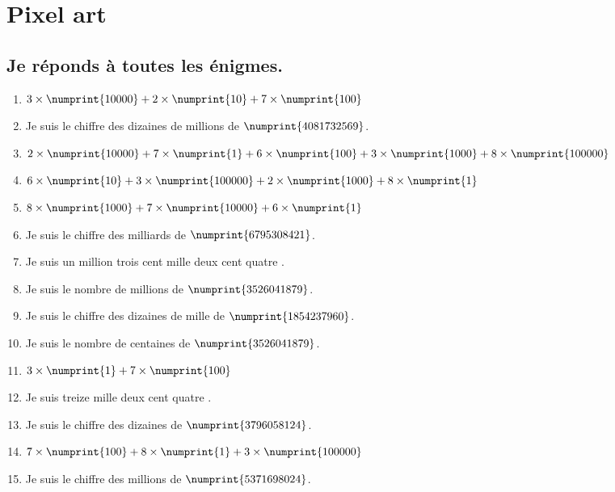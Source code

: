 \documentclass[10pt,a4paper]{article}
\newcommand{\solution}[1]{}
\begin{document}
\section*{Pixel art}
\subsection{Je réponds à toutes les énigmes.}
\begin{multicols}{2}
\begin{enumerate}
\item $3\times\numprint{10000} + 2\times\numprint{10} + 7\times\numprint{100}$
\solution{\numprint{30720}}
\item Je suis le chiffre des dizaines de millions de $\numprint{4081732569}$.
\solution{\numprint{8}}
\item $2\times\numprint{10000} + 7\times\numprint{1} + 6\times\numprint{100} + 3\times\numprint{1000} + 8\times\numprint{100000}$
\solution{\numprint{823607}}
\item $6\times\numprint{10} + 3\times\numprint{100000} + 2\times\numprint{1000} + 8\times\numprint{1}$
\solution{\numprint{302068}}
\item $8\times\numprint{1000} + 7\times\numprint{10000} + 6\times\numprint{1}$
\solution{\numprint{78006}}
\item Je suis le chiffre des milliards de $\numprint{6795308421}$.
\solution{\numprint{6}}
\item Je suis \og un million trois cent mille deux cent quatre \fg{}.
\solution{\numprint{1300204}}
\item Je suis le nombre de millions de $\numprint{3526041879}$.
\solution{\numprint{3526}}
\item Je suis le chiffre des dizaines de mille de $\numprint{1854237960}$.
\solution{\numprint{3}}
\item Je suis le nombre de centaines de $\numprint{3526041879}$.
\solution{\numprint{35260418}}
\item $3\times\numprint{1} + 7\times\numprint{100}$
\solution{\numprint{703}}
\item Je suis \og treize mille deux cent quatre \fg{}.
\solution{\numprint{13204}}
\item Je suis le chiffre des dizaines de $\numprint{3796058124}$.
\solution{\numprint{2}}
\item $7\times\numprint{100} + 8\times\numprint{1} + 3\times\numprint{100000}$
\solution{\numprint{300708}}
\item Je suis le chiffre des millions de $\numprint{5371698024}$.

\end{enumerate}
\end{multicols}
\end{document}
